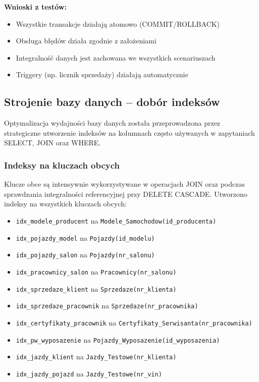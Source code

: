 \documentclass[a4paper,titleauthor]{mwart}
\begin{document}
	\textbf{Wnioski z testów:}
	\begin{itemize}
		\item Wszystkie transakcje działają atomowo (COMMIT/ROLLBACK)
		\item Obsługa błędów działa zgodnie z założeniami
		\item Integralność danych jest zachowana we wszystkich scenariuszach
		\item Triggery (np. licznik sprzedaży) działają automatycznie
	\end{itemize}

	\subsection{Strojenie bazy danych -- dobór indeksów}

	Optymalizacja wydajności bazy danych została przeprowadzona przez strategiczne utworzenie indeksów na kolumnach często używanych w zapytaniach SELECT, JOIN oraz WHERE.

	\subsubsection{Indeksy na kluczach obcych}

	Klucze obce są intensywnie wykorzystywane w operacjach JOIN oraz podczas sprawdzania integralności referencyjnej przy DELETE CASCADE. Utworzono indeksy na wszystkich kluczach obcych:

	\begin{itemize}
		\item \texttt{idx\_modele\_producent} na \texttt{Modele\_Samochodow(id\_producenta)}
		\item \texttt{idx\_pojazdy\_model} na \texttt{Pojazdy(id\_modelu)}
		\item \texttt{idx\_pojazdy\_salon} na \texttt{Pojazdy(nr\_salonu)}
		\item \texttt{idx\_pracownicy\_salon} na \texttt{Pracownicy(nr\_salonu)}
		\item \texttt{idx\_sprzedaze\_klient} na \texttt{Sprzedaze(nr\_klienta)}
		\item \texttt{idx\_sprzedaze\_pracownik} na \texttt{Sprzedaze(nr\_pracownika)}
		\item \texttt{idx\_certyfikaty\_pracownik} na \texttt{Certyfikaty\_Serwisanta(nr\_pracownika)}
		\item \texttt{idx\_pw\_wyposazenie} na \texttt{Pojazdy\_Wyposazenie(id\_wyposazenia)}
		\item \texttt{idx\_jazdy\_klient} na \texttt{Jazdy\_Testowe(nr\_klienta)}
		\item \texttt{idx\_jazdy\_pojazd} na \texttt{Jazdy\_Testowe(nr\_vin)}
	\end{itemize}
\end{document}
